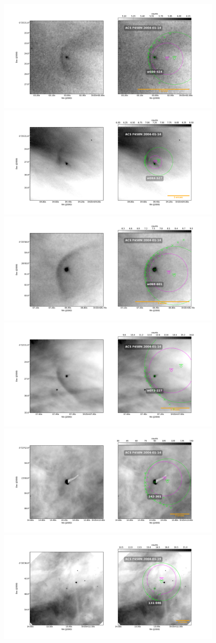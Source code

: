 \documentclass{article}
\begin{document}
\begin{figure}
  \centering
   \includegraphics[width=0.5\linewidth]{j8oc01010_wcs/w030-524-Bally_01-images.pdf}
   \includegraphics[width=0.5\linewidth]{j8oc01010_wcs/w044-527-Bally_01-images.pdf}
   \includegraphics[width=0.5\linewidth]{j8oc01010_wcs/w069-601-Bally_01-images.pdf}
   \includegraphics[width=0.5\linewidth]{j8oc01010_wcs/w073-227-Bally_01-images.pdf}
    \includegraphics[width=0.5\linewidth]{j8oc01010_wcs/142-301-Bally_01-images.pdf}
    \includegraphics[width=0.5\linewidth]{j8oc02010_wcs/131-046-Bally_02-images.pdf}
 \label{fig:images}
\end{figure}
\end{document}
